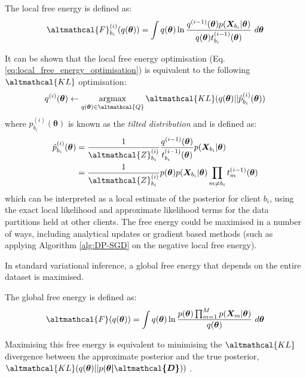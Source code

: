 \begin{definition}
	The local free energy is defined as:
	\begin{align}
	\altmathcal{F}_{b_i}^{(i)}(q(\bm{\theta})) = \int q(\bm{\theta}) \ln \frac{q^{(i-1)}(\bm{\theta}) p(\bm{X}_{b_i}|\bm{\theta})}{q(\bm{\theta}) t_{b_i}^{(i-1)}(\bm{\theta})}\ d\bm{\theta} \label{eq:def-local-free-energy}
	\end{align}
\end{definition}
It can be shown that the local free energy optimisation (Eq. \ref{eq:local_free_energy_optimisation}) is equivalent to the following $\altmathcal{KL}$ optimisation:
\begin{align}
q^{(i)}(\bm{\theta}) \leftarrow  \mathop{\mathrm{argmax}}_{q(\bm{\theta}) \in \altmathcal{Q}} \altmathcal{KL}(q(\bm{\theta}) || \hat{p}^{(i)}_{b_i}(\bm{\theta})) \label{eq:free_energy_kl}
\end{align}
where $\hat{p}^{(i)}_{b_i}(\bm{\theta})$ is known as the \emph{tilted distribution} and is defined as:
\begin{align}
\hat{p}^{(i)}_{b_i}(\bm{\theta}) &= \frac{1}{\altmathcal{Z}^{(i)}_{b_i}} \frac{q^{(i-1)}(\bm{\theta})}{t_{b_i}^{(i-1)}(\bm{\theta})} p(\bm{X}_{b_i}|\bm{\theta}) \\ &=  \frac{1}{\altmathcal{Z}^{(i)}_{b_i}} p(\bm{\theta}) p(\bm{X}_{b_i}| \bm{\theta}) \prod_{m \neq b_i} t_m^{(i-1)}(\bm{\theta})
\end{align}
which can be interpreted as a local estimate of the posterior for client $b_i$, using the exact local likelihood and approximate likelihood terms for the data partitions held at other clients. The free energy could be maximised in a number of ways, including analytical updates or gradient based methods (such as applying Algorithm \ref{alg:DP-SGD} on the negative local free energy).

In standard variational inference, a global free energy that depends on the entire dataset is maximised. 
\begin{definition}
	The global free energy is defined as:
	\begin{align}
	\altmathcal{F}(q(\bm{\theta})) = \int q(\bm{\theta}) \ln \frac{p(\bm{\theta})\prod_{m=1}^M p(\bm{X}_m | \bm{\theta})}{q(\bm{\theta})}\ d\bm{\theta}
	\end{align}
\end{definition}
Maximising this free energy is equivalent to minimising the $\altmathcal{KL}$ divergence between the approximate posterior and the true posterior, $\altmathcal{KL}(q(\bm{\theta})|| p(\bm{\theta| \altmathcal{D}}))$ \citep{Bishop:2006}.

